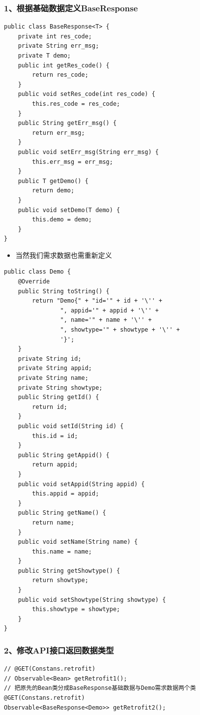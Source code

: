 \documentclass[9pt, b5paper]{article}
\begin{document}
\subsubsection{1、根据基础数据定义BaseResponse}
\label{sec-18-1-1}
\begin{verbatim}
public class BaseResponse<T> {
    private int res_code;
    private String err_msg;
    private T demo;
    public int getRes_code() {
        return res_code;
    }
    public void setRes_code(int res_code) {
        this.res_code = res_code;
    }
    public String getErr_msg() {
        return err_msg;
    }
    public void setErr_msg(String err_msg) {
        this.err_msg = err_msg;
    }
    public T getDemo() {
        return demo;
    }
    public void setDemo(T demo) {
        this.demo = demo;
    }
}
\end{verbatim}
\begin{itemize}
\item 当然我们需求数据也需重新定义
\end{itemize}
\begin{verbatim}
public class Demo {
    @Override
    public String toString() {
        return "Demo{" + "id='" + id + '\'' +
                ", appid='" + appid + '\'' +
                ", name='" + name + '\'' +
                ", showtype='" + showtype + '\'' +
                '}';
    }
    private String id;
    private String appid;
    private String name;
    private String showtype;
    public String getId() {
        return id;
    }
    public void setId(String id) {
        this.id = id;
    }
    public String getAppid() {
        return appid;
    }
    public void setAppid(String appid) {
        this.appid = appid;
    }
    public String getName() {
        return name;
    }
    public void setName(String name) {
        this.name = name;
    }
    public String getShowtype() {
        return showtype;
    }
    public void setShowtype(String showtype) {
        this.showtype = showtype;
    }
}
\end{verbatim}
\subsubsection{2、修改API接口返回数据类型}
\label{sec-18-1-2}
\begin{verbatim}
// @GET(Constans.retrofit)
// Observable<Bean> getRetrofit1();
// 把原先的Bean类分成BaseResponse基础数据与Demo需求数据两个类
@GET(Constans.retrofit)
Observable<BaseResponse<Demo>> getRetrofit2();
\end{verbatim}
\end{document}
